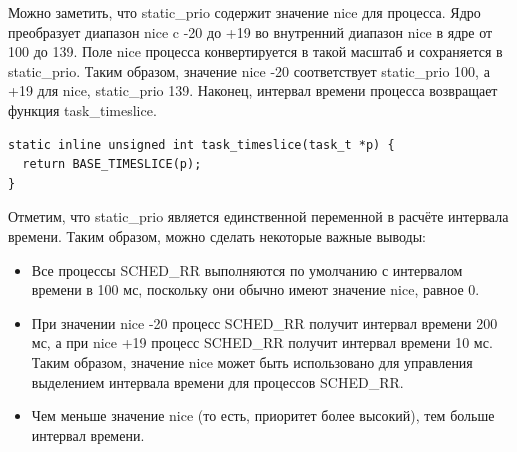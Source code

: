 Можно заметить, что static\_prio содержит значение nice для процесса. Ядро преобразует диапазон nice c -20 до +19 во внутренний диапазон nice  в ядре от 100 до 139. Поле nice процесса конвертируется в такой масштаб и сохраняется в static\_prio. Таким образом, значение nice -20 соответствует static\_prio 100, а +19 для nice, static\_prio 139. Наконец, интервал времени процесса возвращает функция task\_timeslice.

\begin{Verbatim}[frame=single]
static inline unsigned int task_timeslice(task_t *p) {
  return BASE_TIMESLICE(p);
}
\end{Verbatim}

Отметим, что static\_prio является единственной переменной в расчёте интервала времени. Таким образом, можно сделать некоторые важные выводы:
\begin{itemize}
\item Все процессы SCHED\_RR выполняются по умолчанию с интервалом времени в 100 мс, поскольку они обычно имеют значение nice, равное 0.
\item При значении nice -20 процесс SCHED\_RR получит интервал времени 200 мс, а при nice +19 процесс SCHED\_RR получит  интервал времени 10 мс. Таким образом, значение nice может быть использовано для управления выделением интервала времени для процессов SCHED\_RR.
\item Чем меньше значение nice (то есть, приоритет более высокий), тем больше интервал времени.
\end{itemize}
 